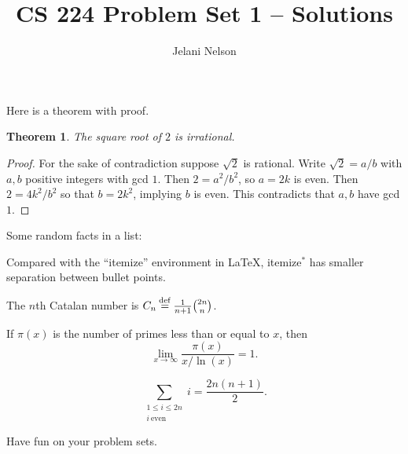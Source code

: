 \documentclass[10pt]{article}
\author{Jelani Nelson}
\title{CS 224 Problem Set 1 -- Solutions}
\newenvironment{itemize*}%
  {\vspace{-2ex} \begin{itemize} %
     \setlength{\itemsep}{-1ex} \setlength{\parsep}{0pt}}%
  {\end{itemize}}
\newcommand{\eqdef}{\mathbin{\stackrel{\rm def}{=}}}
\newtheorem{theorem}{Theorem}
\begin{document}
\maketitle

Here is a theorem with proof.

\begin{theorem}
The square root of $2$ is irrational.
\end{theorem}
\begin{proof}
For the sake of contradiction suppose $\sqrt{2}$ is rational. Write $\sqrt{2} = a/b$ with $a,b$ positive integers with gcd $1$. Then $2 = a^2/b^2$, so $a = 2k$ is even. Then $2 = 4k^2/b^2$ so that $b = 2k^2$, implying $b$ is even. This contradicts that $a,b$ have gcd $1$.
\end{proof}

Some random facts in a list:

\begin{itemize*}
\item Compared with the ``itemize'' environment in \LaTeX, itemize$^*$ has smaller separation between bullet points.
\item The $n$th Catalan number is $C_n \eqdef \frac{1}{n+1} \binom{2n}{n}$.
\item If $\pi(x)$ is the number of primes less than or equal to $x$, then
$$\lim_{x\rightarrow\infty} \frac{\pi(x)}{x/\ln(x)} = 1 . $$
\item $$ \sum_{\substack{1\le i\le 2n\\i\ \mathrm{even}}} i = \frac{2n(n+1)}2 .$$
\end{itemize*}

Have fun on your problem sets.
\end{document}
